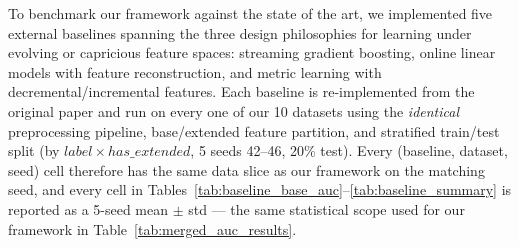 \documentclass[sigconf]{acmart}
\begin{document}
\begin{itemize}
To benchmark our framework against the state of the art, we implemented five external baselines spanning the three design philosophies for learning under evolving or capricious feature spaces: streaming gradient boosting, online linear models with feature reconstruction, and metric learning with decremental/incremental features. Each baseline is re-implemented from the original paper and run on every one of our 10 datasets using the \textit{identical} preprocessing pipeline, base/extended feature partition, and stratified train/test split (by $label\times has\_extended$, 5 seeds 42--46, 20\% test). Every (baseline, dataset, seed) cell therefore has the same data slice as our framework on the matching seed, and every cell in Tables~\ref{tab:baseline_base_auc}--\ref{tab:baseline_summary} is reported as a 5-seed mean $\pm$ std --- the same statistical scope used for our framework in Table~\ref{tab:merged_auc_results}.


\end{itemize}
\end{document}
